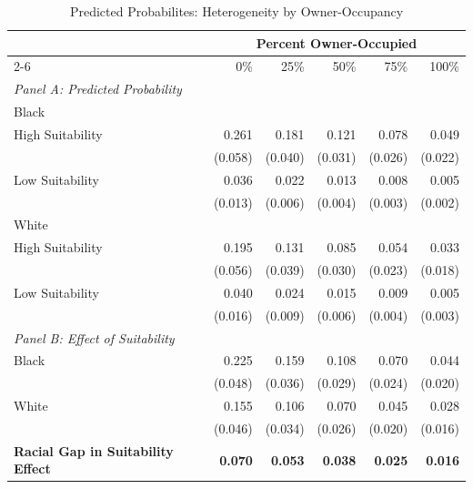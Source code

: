 \begin{table}[h]
\centering
\caption{Predicted Probabilites: Heterogeneity by Owner-Occupancy}
\label{tab:heterogeneity/suitabilityxblacksharexowner}
\begin{threeparttable}
\begin{tabular*}{1\textwidth}{@{\extracolsep{\fill}}lr@{\hspace{1.2em}}r@{\hspace{1.2em}}r@{\hspace{1.2em}}r@{\hspace{1.2em}}r@{\hspace{1.2em}}}
\toprule
 & \multicolumn{5}{c}{Percent Owner-Occupied} \\
\cmidrule(l){2-6}
 & 0\% & 25\% & 50\% & 75\% & 100\% \\
\midrule
\textit{Panel A: Predicted Probability} & & & & & \\
\addlinespace[2pt]
Black & & & & & \\
\quad High Suitability & 0.261 & 0.181 & 0.121 & 0.078 & 0.049 \\
 & (0.058) & (0.040) & (0.031) & (0.026) & (0.022) \\[4pt]
\quad Low Suitability & 0.036 & 0.022 & 0.013 & 0.008 & 0.005 \\
 & (0.013) & (0.006) & (0.004) & (0.003) & (0.002) \\[4pt]
White & & & & & \\
\quad High Suitability & 0.195 & 0.131 & 0.085 & 0.054 & 0.033 \\
 & (0.056) & (0.039) & (0.030) & (0.023) & (0.018) \\[4pt]
\quad Low Suitability & 0.040 & 0.024 & 0.015 & 0.009 & 0.005 \\
 & (0.016) & (0.009) & (0.006) & (0.004) & (0.003) \\[4pt]
\midrule
\textit{Panel B: Effect of Suitability} & & & & & \\
\addlinespace[2pt]
Black & 0.225\rlap{$^{***}$} & 0.159\rlap{$^{***}$} & 0.108\rlap{$^{***}$} & 0.070\rlap{$^{***}$} & 0.044\rlap{$^{**}$} \\
 & (0.048) & (0.036) & (0.029) & (0.024) & (0.020) \\[4pt]
White & 0.155\rlap{$^{***}$} & 0.106\rlap{$^{***}$} & 0.070\rlap{$^{***}$} & 0.045\rlap{$^{**}$} & 0.028\rlap{$^{*}$} \\
 & (0.046) & (0.034) & (0.026) & (0.020) & (0.016) \\[4pt]
\addlinespace[2pt]
\textbf{Racial Gap in Suitability Effect} & \textbf{0.070}\rlap{$^{**}$} & \textbf{0.053}\rlap{$^{*}$} & \textbf{0.038}\rlap{$^{*}$} & \textbf{0.025}\rlap{$^{*}$} & \textbf{0.016} \\

\end{tabular*}
\end{threeparttable}
\end{table}
